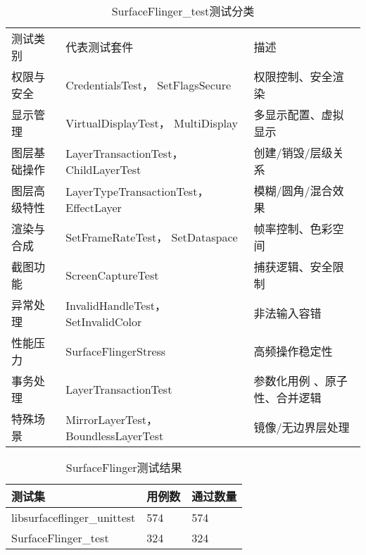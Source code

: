 \begin{table}[H]
    \centering
    \caption{SurfaceFlinger\_test测试分类}
    \label{tab:SurfaceFlinger_test测试分类}
    \begin{tabular}{lll}
        \toprule
        测试类别 & 代表测试套件	& 描述 \\
        权限与安全 & CredentialsTest， SetFlagsSecure & 权限控制、安全渲染 \\
        显示管理 & VirtualDisplayTest， MultiDisplay	& 多显示配置、虚拟显示 \\
        图层基础操作 & LayerTransactionTest， ChildLayerTest	& 创建/销毁/层级关系 \\
        图层高级特性 & LayerTypeTransactionTest， EffectLayer & 模糊/圆角/混合效果 \\
        渲染与合成 & SetFrameRateTest， SetDataspace	& 帧率控制、色彩空间 \\
        截图功能 & ScreenCaptureTest & 捕获逻辑、安全限制 \\
        异常处理 & InvalidHandleTest， SetInvalidColor & 非法输入容错 \\
        性能压力 & SurfaceFlingerStress	& 高频操作稳定性 \\
        事务处理 & LayerTransactionTest &   参数化用例 、原子性、合并逻辑 \\
        特殊场景 & MirrorLayerTest， BoundlessLayerTest & 镜像/无边界层处理 \\        
        \bottomrule
    \end{tabular}
    \note{}
\end{table}

\begin{table}[H]
    \centering
    \caption{SurfaceFlinger测试结果}
    \label{tab:SurfaceFlinger测试结果}
    \begin{tabular}{lll}
      \toprule
      测试集 & 用例数 & 通过数量 \\
      \midrule
      libsurfaceflinger\_unittest & 574 & 574 \\
      SurfaceFlinger\_test & 324 & 324 \\
      \bottomrule
    \end{tabular}
    \note{}
\end{table}



